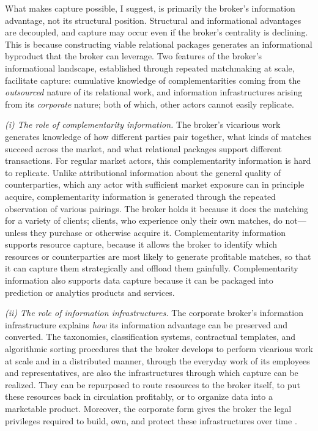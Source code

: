 \documentclass[
]{article}
\begin{document}
What makes capture possible, I suggest, is primarily the broker's information advantage, not its structural position. Structural and informational advantages are decoupled, and capture may occur even if the broker's centrality is declining. This is because constructing viable relational packages generates an informational byproduct that the broker can leverage. Two features of the broker's informational landscape, established through repeated matchmaking at scale, facilitate capture: cumulative knowledge of complementarities coming from the \emph{outsourced} nature of its relational work, and information infrastructures arising from its \emph{corporate} nature; both of which, other actors cannot easily replicate.

\emph{(i) The role of complementarity information.} The broker's vicarious work generates knowledge of how different parties pair together, what kinds of matches succeed across the market, and what relational packages support different transactions. For regular market actors, this complementarity information is hard to replicate. Unlike attributional information about the general quality of counterparties, which any actor with sufficient market exposure can in principle acquire, complementarity information is generated through the repeated observation of various pairings. The broker holds it because it does the matching for a variety of clients; clients, who experience only their own matches, do not---unless they purchase or otherwise acquire it. Complementarity information supports resource capture, because it allows the broker to identify which resources or counterparties are most likely to generate profitable matches, so that it can capture them strategically and offload them gainfully. Complementarity information also supports data capture because it can be packaged into prediction or analytics products and services.

\emph{(ii) The role of information infrastructures.} The corporate broker's information infrastructure explains \emph{how} its information advantage can be preserved and converted. The taxonomies, classification systems, contractual templates, and algorithmic sorting procedures that the broker develops to perform vicarious work at scale and in a distributed manner, through the everyday work of its employees and representatives, are also the infrastructures through which capture can be realized. They can be repurposed to route resources to the broker itself, to put these resources back in circulation profitably, or to organize data into a marketable product. Moreover, the corporate form gives the broker the legal privileges required to build, own, and protect these infrastructures over time \autocite{colemanAsymmetricSociety1982,pistorCodeCapitalHow2019}.
\end{document}
